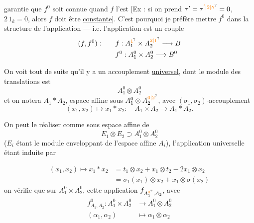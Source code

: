 garantie que $f^0$ soit connue quand $f$ l'est [Ex : si on prend $\tau^{\prime}=\tau^{\unsure{'|2|\prime\prime}}=0$, $2\,1_k=0$, alors $f$ doit être \uline{constante}]. C'est pourquoi je préfère mettre $f^0$ dans la structure de l'application --- i.e. l'application est un couple
\[
 \begin{aligned}
 (f,f^0):\qquad &f:A_1^{\unsure{1}}\times A_2^{\unsure{2|1}}\longrightarrow B\\
 &f^0:A_1^0\times A_2^0\longrightarrow B^0
 \end{aligned}
\]

On voit tout de suite qu'il y a un accouplement \uline{universel}, dont le module des translations est
\[
 A_1^0\otimes A_2^0
\]
et  on notera $A_1\ast A_2$, espace affine sous $A_1^0\otimes A_2^{\unsure{0|2}}$, avec $(\sigma_1,\sigma_2)$-accouplement
\[
 (x_1,x_2)\longmapsto x_1\ast x_2:\quad A_1\times A_2\longrightarrow A_1\ast A_2.
\]

On peut le réaliser comme sous espace affine de
\[
 E_1\otimes E_2\supset A_1^0\otimes A_2^0
\]
($E_i$ étant le module enveloppant de l'espace affine $A_i$), l'application universelle étant induite par

\[
 \boxed{\begin{aligned}
 (x_1,x_2)\longmapsto x_1\ast x_2&=t_1\otimes x_2+x_1\otimes t_2-2x_1\otimes x_2\\
 &=\sigma_1(x_1)\otimes x_2+x_1\otimes\sigma(x_2)
 \end{aligned}}
\]
on vérifie que sur $A_1^0\times A_2^0$, cette application $f_{A_1^{\unsure{0}},A_2}$, avec
\[
 \begin{aligned}
 f^0_{A_1,A_2}: A_1^0\times A_2^0&\longrightarrow A_1^0\otimes A_2^0\\
 (\alpha_1,\alpha_2)&\longmapsto\alpha_1\otimes\alpha_2
 \end{aligned}
\]

